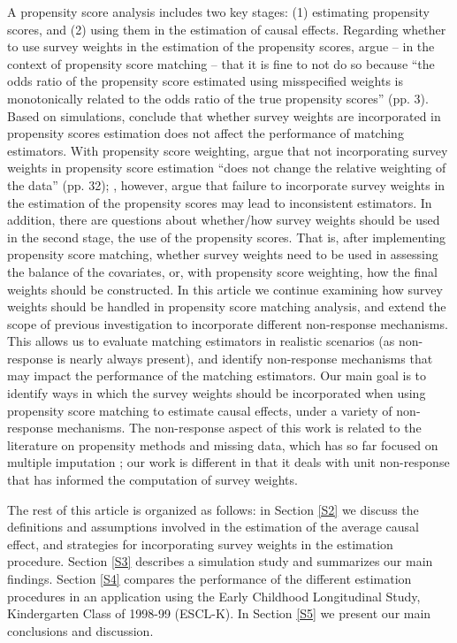 \documentclass[oupdraft]{bio}
\begin{document}
A propensity score analysis includes two key stages: (1) estimating propensity scores, and (2) using them in the estimation of causal effects. Regarding whether to use survey weights in the estimation of the propensity scores, \citet{heckman2009note} argue -- in the context of propensity score matching -- that it is fine to not do so because “the odds ratio of the propensity score estimated using misspecified weights is monotonically related to the odds ratio of the true propensity scores” (pp. 3). Based on simulations, \citet{austin2016propensity} conclude that whether survey weights are incorporated in propensity scores estimation does not affect the performance of matching estimators. With propensity score weighting, \citet{brunell2004propensity} argue that not incorporating survey weights in propensity score estimation “does not change the relative weighting of the data” (pp. 32); \citet{ridgeway2015propensity}, however, argue that failure to incorporate survey weights in the estimation of the propensity scores may lead to inconsistent estimators. 
In addition, there are questions about whether/how survey weights should be used in the second stage,  the use of the propensity scores. That is, after implementing propensity score matching, whether survey weights need to be used in assessing the balance of the covariates, or, with propensity score weighting, how the final weights should be constructed. 
In this article we continue examining how survey weights should be handled in propensity score matching analysis, and extend the scope of previous investigation to incorporate different non-response mechanisms. This allows us to evaluate matching estimators in realistic scenarios (as non-response is nearly always present), and identify non-response mechanisms that may impact the performance of the matching estimators. Our main goal is to identify ways in which the survey weights should be incorporated when using propensity score matching to estimate causal effects, under a variety of non-response mechanisms. The non-response aspect of this work is related to the literature on propensity methods and missing data, which has so far focused on multiple imputation \citep{seaman2012combining,Mitra2016}; our work is different in that it deals with unit non-response that has informed the computation of survey weights.

The rest of this article is organized as follows: in Section \ref{S2} we discuss the definitions and assumptions involved in the estimation of the average causal effect, and strategies for incorporating survey weights in the estimation procedure. Section \ref{S3} describes a simulation study and summarizes our main findings. Section \ref{S4} compares the performance of the different estimation procedures in an application using the Early Childhood Longitudinal Study, Kindergarten Class of 1998-99 (ESCL-K). In Section \ref{S5} we present our main conclusions and discussion.   
\end{document}
